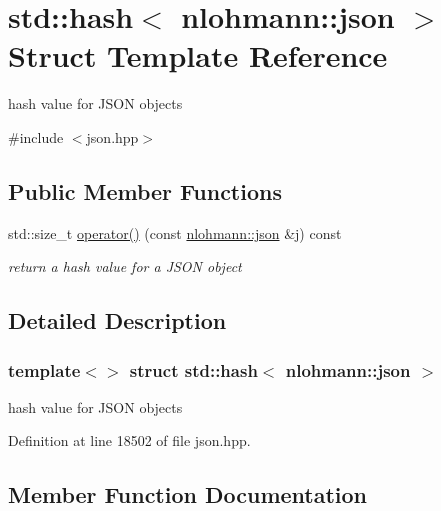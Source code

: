 \hypertarget{structstd_1_1hash_3_01nlohmann_1_1json_01_4}{}\section{std\+:\+:hash$<$ nlohmann\+:\+:json $>$ Struct Template Reference}
\label{structstd_1_1hash_3_01nlohmann_1_1json_01_4}


hash value for J\+S\+ON objects  




{\ttfamily \#include $<$json.\+hpp$>$}

\subsection*{Public Member Functions}
\begin{DoxyCompactItemize}
\item 
std\+::size\+\_\+t \hyperlink{structstd_1_1hash_3_01nlohmann_1_1json_01_4_aec1567d1fa47dbe5b77954dce3a55b64}{operator()} (const \hyperlink{namespacenlohmann_a2bfd99e845a2e5cd90aeaf1b1431f474}{nlohmann\+::json} \&j) const
\begin{DoxyCompactList}\small\item\em return a hash value for a J\+S\+ON object \end{DoxyCompactList}\end{DoxyCompactItemize}


\subsection{Detailed Description}
\subsubsection*{template$<$$>$\newline
struct std\+::hash$<$ nlohmann\+::json $>$}

hash value for J\+S\+ON objects 

Definition at line 18502 of file json.\+hpp.



\subsection{Member Function Documentation}
\mbox{\label{structstd_1_1hash_3_01nlohmann_1_1json_01_4_aec1567d1fa47dbe5b77954dce3a55b64}} 
